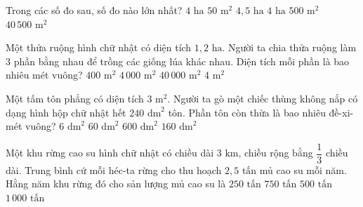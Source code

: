 \begin{ex} %
Trong các số đo sau, số đo nào lớn nhất?
\choice
{$4\text{ ha } 50\text{ m}^2$}
{$4{,}5\text{ ha}$}
{\True $4\text{ ha } 500\text{ m}^2$}
{$40\,500\text{ m}^2$}
\end{ex}

\begin{ex} %
Một thửa ruộng hình chữ nhật có diện tích $1{,}2\text{ ha}$. Người ta chia thửa ruộng làm $3$ phần bằng nhau để trồng các giống lúa khác nhau. Diện tích mỗi phần là bao nhiêu mét vuông?
\choice
{$400\text{ m}^2$}
{\True $4\,000\text{ m}^2$}
{$40\,000\text{ m}^2$}
{$4\text{ m}^2$}
\end{ex}

\begin{ex} %
Một tấm tôn phẳng có diện tích $3\text{ m}^2$. Người ta gò một chiếc thùng không nắp có dạng hình hộp chữ nhật hết $240\text{ dm}^2$ tôn. Phần tôn còn thừa là bao nhiêu đề-xi-mét vuông?
\choice
{$6\text{ dm}^2$}
{\True $60\text{ dm}^2$}
{$600\text{ dm}^2$}
{$160\text{ dm}^2$}
\end{ex}

\begin{ex} %
Một khu rừng cao su hình chữ nhật có chiều dài $3\text{ km}$, chiều rộng bằng $\dfrac{1}{3}$ chiều dài. Trung bình cứ mỗi héc-ta rừng cho thu hoạch $2{,}5\text{ tấn}$ mủ cao su mỗi năm. Hằng năm khu rừng đó cho sản lượng mủ cao su là
\choice
{$250\text{ tấn}$}
{\True $750\text{ tấn}$}
{$500\text{ tấn}$}
{$1\,000\text{ tấn}$}
\end{ex}

